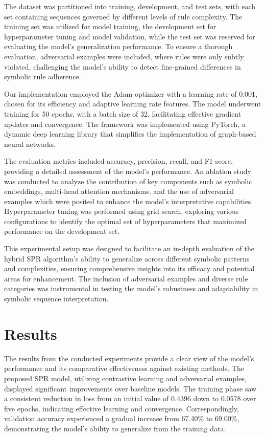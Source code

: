\documentclass{article}
\begin{document}
The dataset was partitioned into training, development, and test sets, with each set containing sequences governed by different levels of rule complexity. The training set was utilized for model training, the development set for hyperparameter tuning and model validation, while the test set was reserved for evaluating the model's generalization performance. To ensure a thorough evaluation, adversarial examples were included, where rules were only subtly violated, challenging the model's ability to detect fine-grained differences in symbolic rule adherence.

Our implementation employed the Adam optimizer with a learning rate of \(0.001\), chosen for its efficiency and adaptive learning rate features. The model underwent training for 50 epochs, with a batch size of 32, facilitating effective gradient updates and convergence. The framework was implemented using PyTorch, a dynamic deep learning library that simplifies the implementation of graph-based neural networks.

The evaluation metrics included accuracy, precision, recall, and F1-score, providing a detailed assessment of the model's performance. An ablation study was conducted to analyze the contribution of key components such as symbolic embeddings, multi-head attention mechanisms, and the use of adversarial examples which were posited to enhance the model's interpretative capabilities. Hyperparameter tuning was performed using grid search, exploring various configurations to identify the optimal set of hyperparameters that maximized performance on the development set.

This experimental setup was designed to facilitate an in-depth evaluation of the hybrid SPR algorithm's ability to generalize across different symbolic patterns and complexities, ensuring comprehensive insights into its efficacy and potential areas for enhancement. The inclusion of adversarial examples and diverse rule categories was instrumental in testing the model's robustness and adaptability in symbolic sequence interpretation.

\section{Results}
The results from the conducted experiments provide a clear view of the model's performance and its comparative effectiveness against existing methods. The proposed SPR model, utilizing contrastive learning and adversarial examples, displayed significant improvements over baseline models. The training phase saw a consistent reduction in loss from an initial value of 0.4396 down to 0.0578 over five epochs, indicating effective learning and convergence. Correspondingly, validation accuracy experienced a gradual increase from 67.40\% to 69.00\%, demonstrating the model's ability to generalize from the training data.
\end{document}
